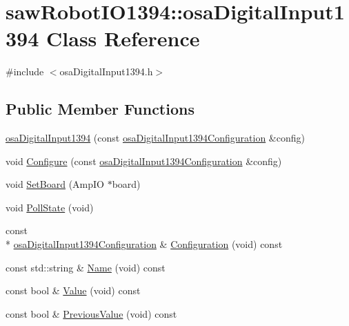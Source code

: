 \hypertarget{classsaw_robot_i_o1394_1_1osa_digital_input1394}{\section{saw\-Robot\-I\-O1394\-:\-:osa\-Digital\-Input1394 Class Reference}
\label{classsaw_robot_i_o1394_1_1osa_digital_input1394}
}


{\ttfamily \#include $<$osa\-Digital\-Input1394.\-h$>$}

\subsection*{Public Member Functions}
\begin{DoxyCompactItemize}
\item 
\hyperlink{classsaw_robot_i_o1394_1_1osa_digital_input1394_a1de20d07136b2eaf707ede2d406720dd}{osa\-Digital\-Input1394} (const \hyperlink{structsaw_robot_i_o1394_1_1osa_digital_input1394_configuration}{osa\-Digital\-Input1394\-Configuration} \&config)
\item 
void \hyperlink{classsaw_robot_i_o1394_1_1osa_digital_input1394_ad9e3c775df55a9e2abb465f4545a8549}{Configure} (const \hyperlink{structsaw_robot_i_o1394_1_1osa_digital_input1394_configuration}{osa\-Digital\-Input1394\-Configuration} \&config)
\item 
void \hyperlink{classsaw_robot_i_o1394_1_1osa_digital_input1394_a388dfbcdba37ad2f5eabfd3941454996}{Set\-Board} (Amp\-I\-O $\ast$board)
\item 
void \hyperlink{classsaw_robot_i_o1394_1_1osa_digital_input1394_acb437ffaafcbed80862b306eb2b4ace7}{Poll\-State} (void)
\item 
const \\*
\hyperlink{structsaw_robot_i_o1394_1_1osa_digital_input1394_configuration}{osa\-Digital\-Input1394\-Configuration} \& \hyperlink{classsaw_robot_i_o1394_1_1osa_digital_input1394_a5abbffca714314398559f8dc45a7bb5b}{Configuration} (void) const 
\item 
const std\-::string \& \hyperlink{classsaw_robot_i_o1394_1_1osa_digital_input1394_a4ced34b2be96f4160ddbc7505133d8ff}{Name} (void) const 
\item 
const bool \& \hyperlink{classsaw_robot_i_o1394_1_1osa_digital_input1394_a3684208bd0337dc4c4d8383681ef87f4}{Value} (void) const 
\item 
const bool \& \hyperlink{classsaw_robot_i_o1394_1_1osa_digital_input1394_a50686a00aaff59bad2fa3cc8f3e6c997}{Previous\-Value} (void) const 
\end{DoxyCompactItemize}
